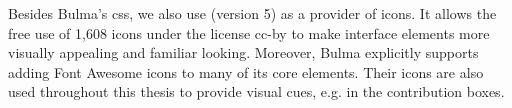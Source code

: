 \documentclass[\relativeRoot/main.tex]{subfiles}
\begin{document}
Besides Bulma's \acrshort{css}, we also use  (version 5) \cite{noauthor_font_2022} as a provider of icons. It allows the free use of 1,608 icons under the license  \gls{cc-by} to make interface elements more visually appealing and familiar looking. Moreover, Bulma explicitly supports adding Font Awesome icons to many of its core elements. Their icons are also used throughout this thesis to provide visual cues, e.g. in the contribution boxes.
\end{document}
